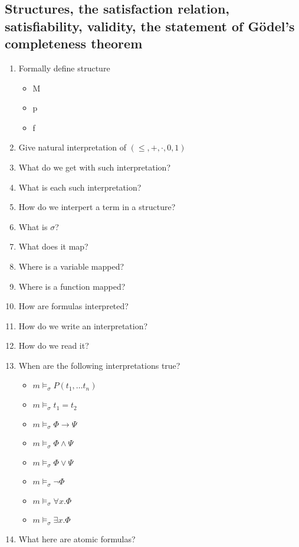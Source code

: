\documentclass[fleqn]{article}
\begin{document}
\subsection{Structures, the satisfaction relation, satisfiability, validity, the statement of Gödel's completeness theorem}
\begin{enumerate}
    \item Formally define structure
    \begin{itemize}
        \item M
        \item p
        \item f
    \end{itemize}
    \item Give natural interpretation of $(\leq, +, \cdot, 0, 1)$
    \item What do we get with such interpretation?
    \item What is each such interpretation?
    \item How do we interpert a term in a structure?
    \item What is $\sigma$?
    \item What does it map?
    \item Where is a variable mapped?
    \item Where is a function mapped?
    \item How are formulas interpreted?
    \item How do we write an interpretation?
    \item How do we read it?
    \item When are the following interpretations true?
    \begin{itemize}
        \item $m \models_{\sigma} P (t_1, \dots t_n)$
        \item $m \models_{\sigma} t_1 = t_2$
        \item $m \models_{\sigma} \Phi \rightarrow \Psi$
        \item $m \models_{\sigma} \Phi \wedge \Psi$
        \item $m \models_{\sigma} \Phi \vee \Psi$
        \item $m \models_{\sigma} \neg \Phi$
        \item $m \models_{\sigma} \forall x. \Phi$
        \item $m \models_{\sigma} \exists x. \Phi$
    \end{itemize}
    \item What here are atomic formulas?

\end{enumerate}
\end{document}
